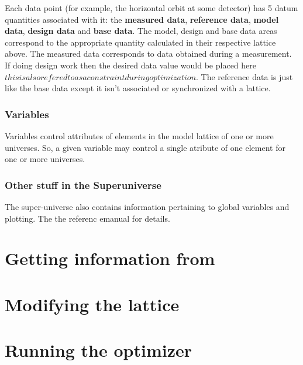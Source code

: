 \documentclass{book}
\begin{document}
Each data point (for example, the horizontal orbit at some detector) has 5 datum
 quantities associated with it: the \textbf{measured data}, \textbf{reference
data}, \textbf{model data}, \textbf{design data} and \textbf{base data}. The
model, design and base data areas correspond to the appropriate quantity
calculated in their respective lattice above. The measured data corresponds to 
data obtained during a measurement. If doing design work then the desired data
value would be placed here \( this is also refered to as a constraint during
optimization\). The reference data is just like the base data except it isn't
associated or synchronized with a lattice.

\subsection{Variables}

Variables control attributes of elements in the model lattice of one or more
universes. So, a given variable may control a single atribute of one element
for one or more universes. 

\subsection{Other stuff in the Superuniverse}

The super-universe also contains information pertaining to global variables and
plotting. The the \tao referenc emanual for details.

\chapter{Getting information from \tao}
\label{c:get_info}

\chapter{Modifying the lattice}
\label{c:modify_lattice}

\chapter{Running the optimizer}
\label{c:optimizer}
\end{document}

